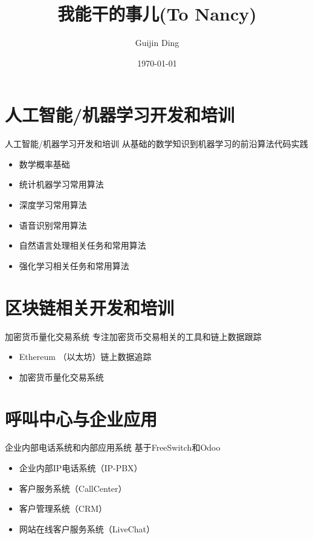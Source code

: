 \documentclass[10pt,aspectratio=43,mathserif,table]{beamer}
\title{我能干的事儿(To Nancy)}
\subtitle{\fontsize{9pt}{14pt}\textbf{}}
\author{Guijin Ding}
\institute{\fontsize{8pt}{14pt}}
\date{\today}
\begin{document}


\section{人工智能/机器学习开发和培训} 

\begin{frame}{人工智能/机器学习开发和培训}
	从基础的数学知识到机器学习的前沿算法代码实践	
\begin{itemize}
	\item<0-> 数学概率基础
	\item<0-> 统计机器学习常用算法
	\item<0-> 深度学习常用算法
	\item<0-> 语音识别常用算法
	\item<0-> 自然语言处理相关任务和常用算法
	\item<0-> 强化学习相关任务和常用算法
\end{itemize}
\end{frame}

\section{区块链相关开发和培训} 

\begin{frame}{加密货币量化交易系统}
	专注加密货币交易相关的工具和链上数据跟踪
\begin{itemize}
\item<0-> Ethereum （以太坊）链上数据追踪
\item<0-> 加密货币量化交易系统
\end{itemize}
\end{frame}


\section{呼叫中心与企业应用} 

\begin{frame}{企业内部电话系统和内部应用系统}
	基于FreeSwitch和Odoo
\begin{itemize}
\item<0-> 企业内部IP电话系统（IP-PBX）
\item<0-> 客户服务系统（CallCenter）
\item<0-> 客户管理系统（CRM）
\item<0-> 网站在线客户服务系统（LiveChat）
\end{itemize}
\end{frame}
\end{document}
